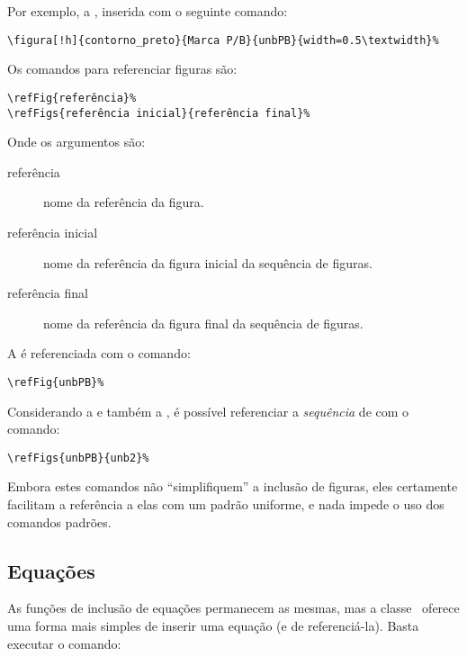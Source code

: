 Por exemplo, a , inserida com o seguinte comando:

\begin{verbatim}
\figura[!h]{contorno_preto}{Marca P/B}{unbPB}{width=0.5\textwidth}%
\end{verbatim}

%

Os comandos para referenciar figuras são:

\begin{verbatim}
\refFig{referência}%
\refFigs{referência inicial}{referência final}%
\end{verbatim}

Onde os argumentos são:
\begin{description}
\item[referência] nome da referência da figura.
\item[referência inicial] nome da referência da figura inicial da sequência de figuras.
\item[referência final] nome da referência da figura final da sequência de figuras.
\end{description}

A  é referenciada com o comando:
\begin{verbatim}
\refFig{unbPB}%
\end{verbatim}

%

Considerando a  e também a , é possível referenciar
a \emph{sequência} de  com o comando:
\begin{verbatim}
\refFigs{unbPB}{unb2}%
\end{verbatim}

Embora estes comandos não ``simplifiquem'' a inclusão de figuras, eles
certamente facilitam a referência a elas com um padrão uniforme, e nada impede o
uso dos comandos padrões.

%



\subsection{Equações}
As funções de inclusão de equações permanecem as mesmas, mas a classe \unbcic\
oferece uma forma mais simples de inserir uma equação (e de referenciá-la). Basta
executar o comando:

